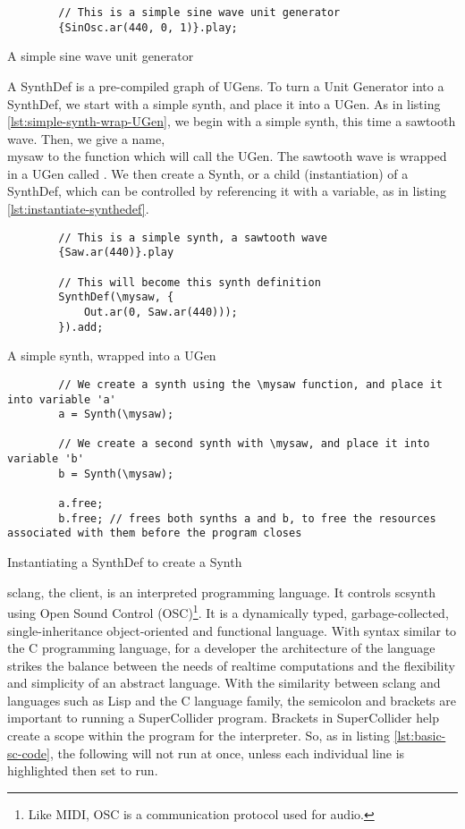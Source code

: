 \begin{listing}
	\begin{lstlisting}
		// This is a simple sine wave unit generator
		{SinOsc.ar(440, 0, 1)}.play;
	\end{lstlisting}
	\caption{A simple sine wave unit generator}
	\label{lst:sine-wave-ug}
\end{listing}

A SynthDef is a pre-compiled graph of UGens. To turn a Unit Generator into a SynthDef, we start with a simple synth, and place it into a UGen. As in listing \ref{lst:simple-synth-wrap-UGen}, we begin with a simple synth, this time a sawtooth wave. Then, we give a name, \\mysaw to the function which will call the UGen. The sawtooth wave is wrapped in a UGen called . We then create a Synth, or a child (instantiation) of a SynthDef, which can be controlled by referencing it with a variable, as in listing \ref{lst:instantiate-synthedef}\cite{McCartney_2021}.

\begin{listing}
	\begin{lstlisting}
		// This is a simple synth, a sawtooth wave
		{Saw.ar(440)}.play
		
		// This will become this synth definition
		SynthDef(\mysaw, {
			Out.ar(0, Saw.ar(440)));
		}).add;
	\end{lstlisting}
	\caption{A simple synth, wrapped into a UGen}
	\label{lst:simple-synth-wrap-UGen}
\end{listing}

\begin{listing}
	\begin{lstlisting}
		// We create a synth using the \mysaw function, and place it into variable 'a'
		a = Synth(\mysaw);
		
		// We create a second synth with \mysaw, and place it into variable 'b'
		b = Synth(\mysaw);
		
		a.free;
		b.free; // frees both synths a and b, to free the resources associated with them before the program closes
	\end{lstlisting}
	\caption{Instantiating a SynthDef to create a Synth}
	\label{lst:instantiate-synthedef}
\end{listing}

sclang, the client, is an interpreted programming language. It controls scsynth using Open Sound Control (OSC)\footnote{Like MIDI, OSC is a communication protocol used for audio.}. It is a dynamically typed, garbage-collected, single-inheritance object-oriented and functional language\cite{Wilson_Cottle_Collins_2016}. With syntax similar to the C programming language, for a developer the architecture of the language strikes the balance between the needs of realtime computations and the flexibility and simplicity of an abstract language. With the similarity between sclang and languages such as Lisp and the C language family, the semicolon and brackets are important to running a SuperCollider program. Brackets in SuperCollider help create a scope within the program for the interpreter. So, as in listing \ref{lst:basic-sc-code}, the following will not run at once, unless each individual line is highlighted then set to run.

